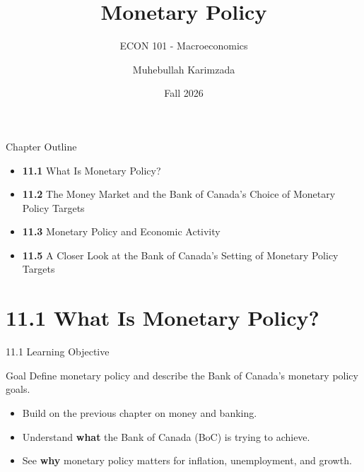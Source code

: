 \documentclass[aspectratio=169]{beamer}
\title{\textbf{Monetary Policy \vspace{.5cm}\\  }}
\subtitle{ {\large ECON 101 - Macroeconomics}}
\author{Muhebullah Karimzada}
\date{Fall 2026}
\begin{document}
\begin{frame}[plain]
  \titlepage
\end{frame}

\begin{frame}{Chapter Outline}
\transfade
\begin{itemize}
  \item \textbf{11.1} What Is Monetary Policy?
  \item \textbf{11.2} The Money Market and the Bank of Canada’s Choice of Monetary Policy Targets
  \item \textbf{11.3} Monetary Policy and Economic Activity
  \item \textbf{11.5} A Closer Look at the Bank of Canada’s Setting of Monetary Policy Targets
\end{itemize}
\end{frame}

\section{11.1 What Is Monetary Policy?}

\begin{frame}{11.1 Learning Objective}
\transfade
\begin{block}{Goal}
Define monetary policy and describe the Bank of Canada’s monetary policy goals.
\end{block}
\begin{itemize}
  \item Build on the previous chapter on money and banking.
  \item Understand \textbf{what} the Bank of Canada (BoC) is trying to achieve.
  \item See \textbf{why} monetary policy matters for inflation, unemployment, and growth.
\end{itemize}
\end{frame}
\end{document}
